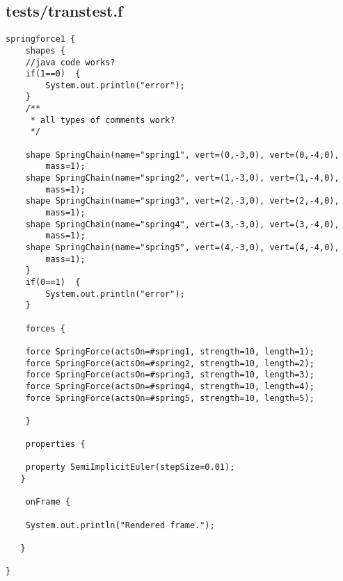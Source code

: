\subsection*{tests/transtest.f}
\begin{lstlisting}
springforce1 {
    shapes {
	//java code works?
	if(1==0)  {
		System.out.println("error");
	}
	/**
	 * all types of comments work?
	 */

	shape SpringChain(name="spring1", vert=(0,-3,0), vert=(0,-4,0),
		mass=1);
	shape SpringChain(name="spring2", vert=(1,-3,0), vert=(1,-4,0),
		mass=1);
	shape SpringChain(name="spring3", vert=(2,-3,0), vert=(2,-4,0),
		mass=1);
	shape SpringChain(name="spring4", vert=(3,-3,0), vert=(3,-4,0),
		mass=1);
	shape SpringChain(name="spring5", vert=(4,-3,0), vert=(4,-4,0),
		mass=1);
    }
	if(0==1)  {
		System.out.println("error");
	}

    forces {

	force SpringForce(actsOn=#spring1, strength=10, length=1);
	force SpringForce(actsOn=#spring2, strength=10, length=2);
	force SpringForce(actsOn=#spring3, strength=10, length=3);
	force SpringForce(actsOn=#spring4, strength=10, length=4);
	force SpringForce(actsOn=#spring5, strength=10, length=5);

    }

    properties { 

	property SemiImplicitEuler(stepSize=0.01);
   }

    onFrame {

	System.out.println("Rendered frame.");

   }   

}
\end{lstlisting}

